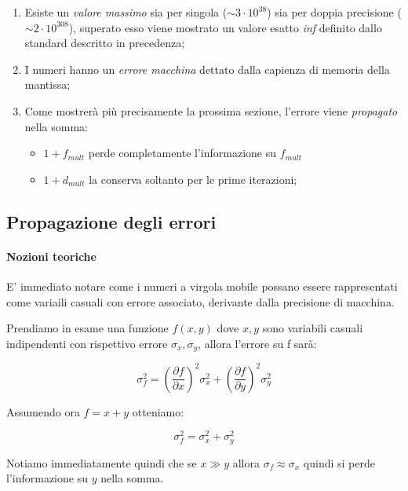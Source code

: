 \begin{enumerate}
	\item Esiste un \textit{valore massimo} sia per singola ($\sim 3 \cdot 10^{38}$) sia
	      per doppia precisione ($\sim 2 \cdot 10^{308}$), superato esso viene mostrato un
	      valore esatto \textit{inf} definito dallo standard descritto in precedenza;

	\item I numeri hanno un \textit{errore macchina} dettato dalla capienza di memoria della mantissa;

	\item Come mostrerà più precisamente la prossima sezione, l’errore viene
	      \textit{propagato} nella somma:

	      \begin{itemize}
		      \item $1 + f_{mult}$ perde completamente l’informazione su $f_{mult}$

		      \item $1 + d_{mult}$ la conserva soltanto per le prime iterazioni;
	      \end{itemize}
\end{enumerate}
\subsection{Propagazione degli errori}

\paragraph{Nozioni teoriche}

E' immediato notare come i numeri a virgola mobile possano essere rappresentati come
variaili casuali con errore associato, derivante dalla precisione di macchina.

Prendiamo in esame una funzione $f(x, y)$ dove $x, y$ sono variabili casuali indipendenti
con rispettivo errore $\sigma_x, \sigma_y$, allora l'errore su f sarà:

$$
	\sigma_f^2 = {\left( \frac{\partial f}{\partial x} \right)^2 \sigma_x^2 + \left( \frac{\partial f}{\partial y} \right)^2 \sigma_y^2}
$$

Assumendo ora $f = x + y$ otteniamo:

$$
	\sigma_f^2 = {\sigma_x^2 + \sigma_y^2}
$$

Notiamo immediatamente quindi che se $x \gg y $ allora $\sigma_f \approx \sigma_x$ quindi
si perde l'informazione su $y$ nella somma.

